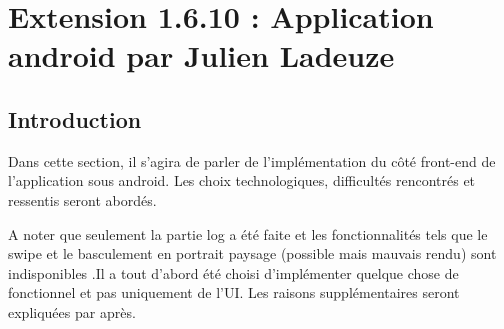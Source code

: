 \section{Extension 1.6.10 : Application android par Julien Ladeuze}
\subsection{Introduction}
\begin{flushleft}
Dans cette section, il s'agira de parler de l'implémentation du côté front-end de l'application sous android. Les choix technologiques, difficultés rencontrés et ressentis seront abordés.
\end{flushleft}
\begin{flushleft}
    A noter que seulement la partie log a été faite et les fonctionnalités tels que le swipe et le basculement en portrait paysage (possible mais mauvais rendu) sont indisponibles .Il a tout d'abord été choisi d'implémenter quelque chose de fonctionnel et pas uniquement de l'UI. Les raisons supplémentaires seront expliquées par après.
\end{flushleft}